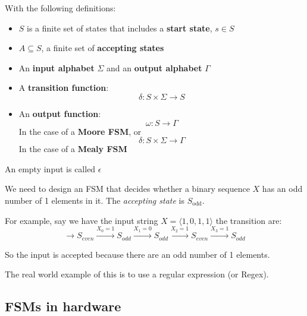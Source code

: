 \documentclass[11pt,a4paper,titlepage,dvipsnames,cmyk]{scrartcl}
\begin{document}
With the following definitions:
\begin{itemize}
    \item $S$ is a finite set of states that includes a \textbf{start
        state}, $s \in S$
    \item $A \subseteq S$, a finite set of \textbf{accepting states}
    \item An \textbf{input alphabet} $\Sigma$ and an \textbf{output
        alphabet} $\Gamma$
    \item A \textbf{transition function}:
        \begin{equation*}
            \delta : S \times \Sigma \rightarrow S
        \end{equation*}
    \item An \textbf{output function}:
        \begin{equation*}
            \omega : S \rightarrow \Gamma
        \end{equation*}
        In the case of a \textbf{Moore FSM}, or
        \begin{equation*}
            \delta : S \times \Sigma \rightarrow \Gamma
        \end{equation*}
        In the case of a \textbf{Mealy FSM} 
\end{itemize}

An empty input is called $\epsilon$

We need to design an FSM that decides whether a binary sequence $X$ has an
odd number of 1 elements in it. The \textit{accepting state} is
$S_{\text{odd}}$.

For example, say we have the input string $X = \langle 1,0,1,1 \rangle$
the transition are:
\begin{equation*}
    \rightarrow S_{even} \xrightarrow{X_0 = 1} S_{odd} \xrightarrow{X_1 =
0} S_{odd} \xrightarrow{X_2 = 1} S_{even} \xrightarrow{X_3 = 1}
    S_{odd}
\end{equation*}

So the input is accepted because there are an odd number of 1 elements.

The real world example of this is to use a regular expression (or Regex).

\subsection{FSMs in hardware}%
\label{sub:hardware-fsm}
\end{document}
